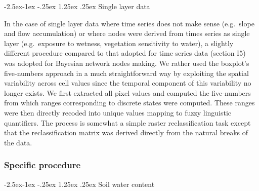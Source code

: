\documentclass[12pt,oneside]{article}
\makeatletter
\renewcommand\paragraph{\@startsection{paragraph}{4}{\z@}%
            {-2.5ex\@plus -1ex \@minus -.25ex}%
            {1.25ex \@plus .25ex}%
            {\normalfont\normalsize\bfseries}}
\makeatother
\begin{document}
\hypertarget{I512}{%
\paragraph{Single layer data}\label{I512}}

In the case of single layer data where time series does not make sense (e.g.~slope and flow accumulation) or where nodes were derived from times series as single layer (e.g.~exposure to wetness, vegetation sensitivity to water), a slightly different procedure compared to that adopted for time series data (section I5) was adopted for Bayesian network nodes making. We rather used the boxplot's five-numbers approach in a much straightforward way by exploiting the spatial variability across cell values since the temporal component of this variability no longer exists. We first extracted all pixel values and computed the five-numbers from which ranges corresponding to discrete states were computed. These ranges were then directly recoded into unique values mapping to fuzzy linguistic quantifiers. The process is somewhat a simple raster reclassification task except that the reclassification matrix was derived directly from the natural breaks of the data.

\hypertarget{I52}{%
\subsubsection{Specific procedure}\label{I52}}

\hypertarget{I521}{%
\paragraph{Soil water content}\label{I521}}
\end{document}

